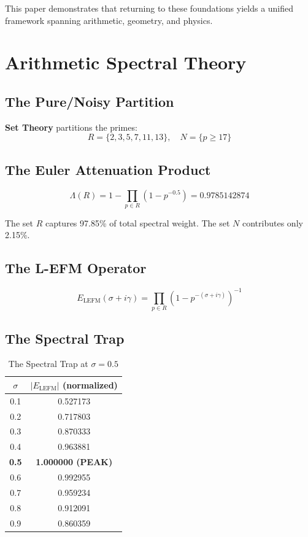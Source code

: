 \documentclass[12pt,a4paper]{article}
\begin{document}
This paper demonstrates that returning to these foundations yields a unified framework spanning arithmetic, geometry, and physics.

\section{Arithmetic Spectral Theory}

\subsection{The Pure/Noisy Partition}
\textbf{Set Theory} partitions the primes:
\[
R = \{2, 3, 5, 7, 11, 13\}, \quad N = \{p \geq 17\}
\]

\subsection{The Euler Attenuation Product}
\begin{equation}
\Lambda(R) = 1 - \prod_{p \in R} (1 - p^{-0.5}) = 0.9785142874
\label{eq:attenuation}
\end{equation}

The set $R$ captures 97.85\% of total spectral weight. The set $N$ contributes only 2.15\%.

\subsection{The L-EFM Operator}
\begin{equation}
E_{\text{LEFM}}(\sigma + i\gamma) = \prod_{p \in R} (1 - p^{-(\sigma + i\gamma)})^{-1}
\label{eq:lefm}
\end{equation}

\subsection{The Spectral Trap}

\begin{table}[htbp]
\centering
\begin{tabular}{cc}
\toprule
$\sigma$ & $|E_{\text{LEFM}}|$ (normalized) \\
\midrule
0.1 & 0.527173 \\
0.2 & 0.717803 \\
0.3 & 0.870333 \\
0.4 & 0.963881 \\
\textbf{0.5} & \textbf{1.000000 (PEAK)} \\
0.6 & 0.992955 \\
0.7 & 0.959234 \\
0.8 & 0.912091 \\
0.9 & 0.860359 \\
\bottomrule
\end{tabular}
\caption{The Spectral Trap at $\sigma = 0.5$}
\label{tab:spectral_trap}
\end{table}
\end{document}
